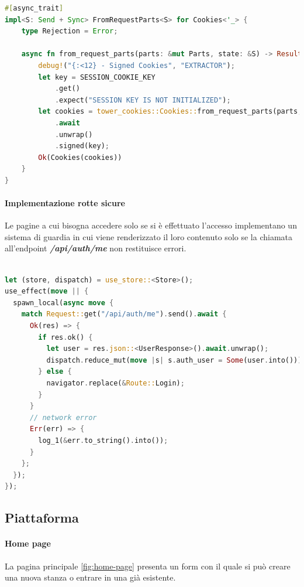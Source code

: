 \documentclass{article}
\begin{document}
\begin{lstlisting}[language=Rust, style=boxed, label={lst:signed-cookies-extractor}, captionpos=b,caption={Extractor implementato per decodificare i cookie ad ogni richiesta}]
#[async_trait]
impl<S: Send + Sync> FromRequestParts<S> for Cookies<'_> {
    type Rejection = Error;

    async fn from_request_parts(parts: &mut Parts, state: &S) -> Result<Self, Error> {
        debug!("{:<12} - Signed Cookies", "EXTRACTOR");
        let key = SESSION_COOKIE_KEY
            .get()
            .expect("SESSION KEY IS NOT INITIALIZED");
        let cookies = tower_cookies::Cookies::from_request_parts(parts, state)
            .await
            .unwrap()
            .signed(key);
        Ok(Cookies(cookies))
    }
}
\end{lstlisting}

\paragraph{Implementazione rotte sicure} Le pagine a cui bisogna accedere solo se si è 
effettuato l'accesso implementano un sistema di guardia in cui viene renderizzato il 
loro contenuto solo se la chiamata all'endpoint \textbf{\textit{/api/auth/me}} non 
restituisce errori.

\begin{lstlisting}[language=Rust, style=boxed, label={lst:signed-cookies-extractor}, captionpos=b,caption={Extractor implementato per decodificare i cookie ad ogni richiesta}]

let (store, dispatch) = use_store::<Store>();
use_effect(move || {
  spawn_local(async move {
    match Request::get("/api/auth/me").send().await {
      Ok(res) => {
        if res.ok() {
          let user = res.json::<UserResponse>().await.unwrap();
          dispatch.reduce_mut(move |s| s.auth_user = Some(user.into()));
        } else {
          navigator.replace(&Route::Login);
        }
      }
      // network error
      Err(err) => {
        log_1(&err.to_string().into());
      }
    };
  });
});
\end{lstlisting}

\clearpage

\subsection{Piattaforma}
\paragraph{Home page}
La pagina principale \cref{fig:home-page} 
presenta un form con il quale si può creare una nuova stanza o entrare in una già
esistente.
\end{document}
